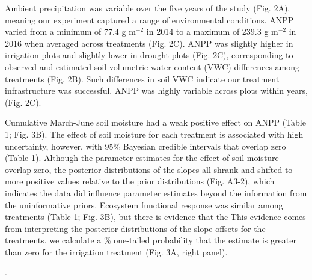 \documentclass[fleqn,10pt,lineno]{wlpeerj} %
\begin{document}
Ambient precipitation was variable over the five years of the study
(Fig. 2A), meaning our experiment captured a range of environmental
conditions. ANPP varied from a minimum of 77.4 g m\(^{-2}\) in 2014 to a
maximum of 239.3 g m\(^{-2}\) in 2016 when averaged across treatments
(Fig. 2C). ANPP was slightly higher in irrigation plots
 and slightly lower in drought plots
 (Fig. 2C),
corresponding to observed and estimated soil volumetric water content
(VWC) differences among treatments (Fig. 2B).
Such differences in soil VWC indicate our treatment infrastructure was
successful. ANPP was highly variable across plots within years,
(Fig. 2C).

Cumulative March-June soil moisture had a weak positive effect on ANPP
(Table 1; Fig. 3B). The effect of soil moisture for each treatment is
associated with high uncertainty, however, with 95\% Bayesian credible
intervals that  overlap zero (Table 1). Although the
parameter estimates for the effect of soil moisture overlap zero, the
posterior distributions of the slopes all shrank and shifted to more
positive values relative to the prior distributions (Fig. A3-2), which
indicates the data did influence parameter estimates beyond the
information from the uninformative priors. Ecosystem functional response
was similar among treatments (Table 1; Fig. 3B), but there is evidence
that the
This evidence comes from interpreting the posterior distributions of the
slope offsets for the treatments.  we
calculate a \% one-tailed probability that the estimate is
greater than zero for the irrigation treatment
(Fig. 3A, right panel).

.
\end{document}
